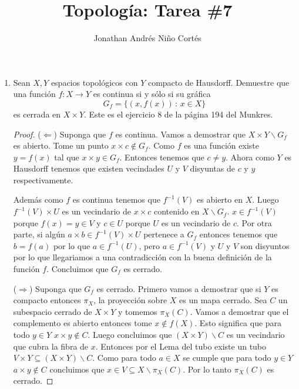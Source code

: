 \documentclass[letter,twoside,12pt]{article}
\title{Topología: Tarea \#7}
\author{Jonathan Andrés Niño Cortés}
\begin{document}
\maketitle
\begin{enumerate}
	\item Sean $ X, Y $ espacios topológicos con $ Y $ compacto de Hausdorff. Demuestre que una función $ f: X \to Y $ es continua si y sólo si su gráfica 
	\begin{equation}
	G_f = \{(x,f(x))\,:\,x \in X \} \nonumber
	\end{equation}
	es cerrada en $ X \times Y $. Este es el ejercicio 8 de la página 194 del Munkres.
	\begin{proof}
		($ \Leftarrow $) Suponga que $ f $ es continua. Vamos a demostrar que $X \times Y \backslash G_f $ es abierto. Tome un punto $ x \times c \not \in G_f $. Como $ f $ es una función existe $ y = f(x) $ tal que $ x \times y \in G_f $. Entonces tenemos que $ c \not = y $. Ahora como $ Y $ es Hausdorff tenemos que existen vecindades $ U $ y $ V $ disyuntas de $ c $ y $ y $ respectivamente.
		
		Además como $ f $ es continua tenemos que $ f^{-1}(V) $ es abierto en $ X $. Luego $  f^{-1}(V) \times U $ es un vecindario de $ x \times c $ contenido en $ X \backslash G_f $. $ x \in f^{-1}(V) $ porque $ f(x)=y \in V $ y $ c \in U $ porque $ U $ es un vecindario de $ c $. Por otra parte, si algún $ a \times b \in f^{-1}(V) \times U $ pertenece a $ G_f $ entonces tenemos que $ b = f(a) $ por lo que $ a \in f^{-1}(U) $, pero $ a \in f^{-1}(V) $ y $ U $ y $ V $ son disyuntos por lo que llegariamos a una contradicción con la buena definición de la función $ f $. Concluimos que $ G_f $ es cerrado.
		
		($ \Rightarrow $) Suponga que $ G_f $ es cerrado. Primero vamos a demostrar que si $ Y $ es compacto entonces $ \pi_X $, la proyección sobre $ X $ es un mapa cerrado. Sea $ C $ un subespacio cerrado de $ X \times Y $ y tomemos $ \pi_X(C) $. Vamos a demostrar que el complemento es abierto entonces tome $ x \not  \in f(X) $. Esto significa que para todo $ y \in Y $ $ x \times y \not \in C $. Luego concluimos que $ (X \times Y) \backslash C $ es un vecindario que cubra la fibra de $ x $. Entonces por el Lema del tubo existe un tubo $ V \times Y \subseteq (X \times Y)\backslash C $. Como para todo $ a \in X $ se cumple que para todo $ y \in Y $ $ a \times y \not \in C $ concluimos que $ x \in V \subseteq X \backslash \pi_X(C)$. Por lo tanto $  \pi_X(C) $ es cerrado.
		

\end{proof}
\end{enumerate}
\end{document}
